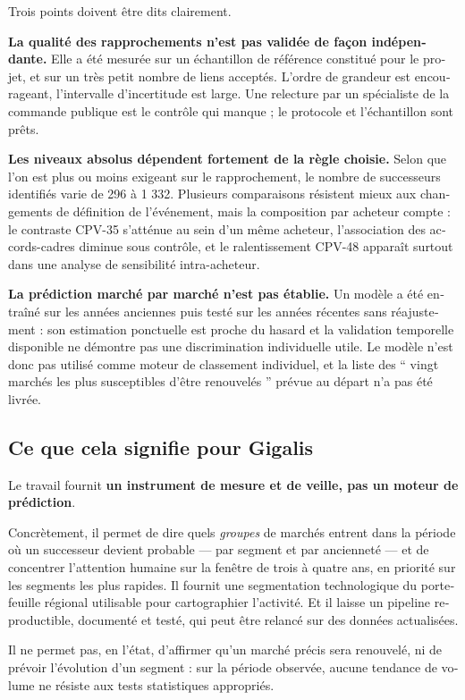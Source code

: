 \begin{otherlanguage}{french}
Trois points doivent être dits clairement.

\textbf{La qualité des rapprochements n'est pas validée de façon indépendante.} Elle a été mesurée sur un échantillon de référence constitué pour le projet, et sur un très petit nombre de liens acceptés. L'ordre de grandeur est encourageant, l'intervalle d'incertitude est large. Une relecture par un spécialiste de la commande publique est le contrôle qui manque ; le protocole et l'échantillon sont prêts.

\textbf{Les niveaux absolus dépendent fortement de la règle choisie.} Selon que l'on est plus ou moins exigeant sur le rapprochement, le nombre de successeurs identifiés varie de 296 à 1 332. Plusieurs comparaisons résistent mieux aux changements de définition de l'événement, mais la composition par acheteur compte : le contraste CPV-35 s'atténue au sein d'un même acheteur, l'association des accords-cadres diminue sous contrôle, et le ralentissement CPV-48 apparaît surtout dans une analyse de sensibilité intra-acheteur.

\textbf{La prédiction marché par marché n'est pas établie.} Un modèle a été entraîné sur les années anciennes puis testé sur les années récentes sans réajustement : son estimation ponctuelle est proche du hasard et la validation temporelle disponible ne démontre pas une discrimination individuelle utile. Le modèle n'est donc pas utilisé comme moteur de classement individuel, et la liste des `` vingt marchés les plus susceptibles d'être renouvelés '' prévue au départ n'a pas été livrée.

\subsection*{Ce que cela signifie pour Gigalis}

Le travail fournit \textbf{un instrument de mesure et de veille, pas un moteur de prédiction}.

Concrètement, il permet de dire quels \emph{groupes} de marchés entrent dans la période où un successeur devient probable --- par segment et par ancienneté --- et de concentrer l'attention humaine sur la fenêtre de trois à quatre ans, en priorité sur les segments les plus rapides. Il fournit une segmentation technologique du portefeuille régional utilisable pour cartographier l'activité. Et il laisse un pipeline reproductible, documenté et testé, qui peut être relancé sur des données actualisées.

Il ne permet pas, en l'état, d'affirmer qu'un marché précis sera renouvelé, ni de prévoir l'évolution d'un segment : sur la période observée, aucune tendance de volume ne résiste aux tests statistiques appropriés.


\end{otherlanguage}
